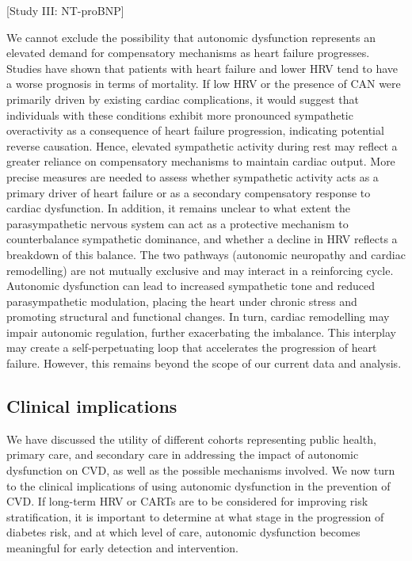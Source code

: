 \documentclass[
  a4paper,
  headsepline=true,
  open=any]{scrbook}
\begin{document}
{[}Study III: NT-proBNP{]}

We cannot exclude the possibility that autonomic dysfunction represents
an elevated demand for compensatory mechanisms as heart failure
progresses. Studies have shown that patients with heart failure and
lower HRV tend to have a worse prognosis in terms of mortality. If low
HRV or the presence of CAN were primarily driven by existing cardiac
complications, it would suggest that individuals with these conditions
exhibit more pronounced sympathetic overactivity as a consequence of
heart failure progression, indicating potential reverse causation.
Hence, elevated sympathetic activity during rest may reflect a greater
reliance on compensatory mechanisms to maintain cardiac output. More
precise measures are needed to assess whether sympathetic activity acts
as a primary driver of heart failure or as a secondary compensatory
response to cardiac dysfunction. In addition, it remains unclear to what
extent the parasympathetic nervous system can act as a protective
mechanism to counterbalance sympathetic dominance, and whether a decline
in HRV reflects a breakdown of this balance. The two pathways (autonomic
neuropathy and cardiac remodelling) are not mutually exclusive and may
interact in a reinforcing cycle. Autonomic dysfunction can lead to
increased sympathetic tone and reduced parasympathetic modulation,
placing the heart under chronic stress and promoting structural and
functional changes. In turn, cardiac remodelling may impair autonomic
regulation, further exacerbating the imbalance. This interplay may
create a self-perpetuating loop that accelerates the progression of
heart failure. However, this remains beyond the scope of our current
data and analysis.

\hypertarget{clinical-implications}{%
\subsection{Clinical implications}\label{clinical-implications}}

We have discussed the utility of different cohorts representing public
health, primary care, and secondary care in addressing the impact of
autonomic dysfunction on CVD, as well as the possible mechanisms
involved. We now turn to the clinical implications of using autonomic
dysfunction in the prevention of CVD. If long-term HRV or CARTs are to
be considered for improving risk stratification, it is important to
determine at what stage in the progression of diabetes risk, and at
which level of care, autonomic dysfunction becomes meaningful for early
detection and intervention.
\end{document}

